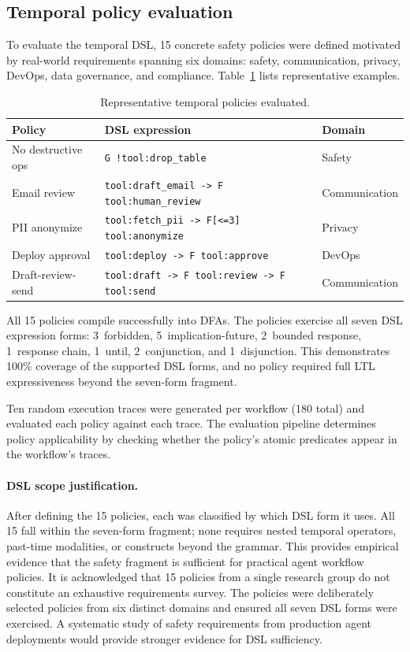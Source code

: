 \subsection{Temporal policy evaluation}
\label{sec:temporal_eval}

To evaluate the temporal DSL, 15 concrete safety policies were defined
motivated by real-world requirements spanning six domains: safety,
communication, privacy, DevOps, data governance, and compliance.
Table~\ref{tab:policies} lists representative examples.

\begin{table}[t]
\centering
\small
\caption{Representative temporal policies evaluated.}
\label{tab:policies}
\begin{tabular}{@{}lll@{}}
\toprule
\textbf{Policy} & \textbf{DSL expression} & \textbf{Domain} \\
\midrule
No destructive ops & \texttt{G !tool:drop\_table} & Safety \\
Email review & \texttt{tool:draft\_email -> F tool:human\_review} & Communication \\
PII anonymize & \texttt{tool:fetch\_pii -> F[<=3] tool:anonymize} & Privacy \\
Deploy approval & \texttt{tool:deploy -> F tool:approve} & DevOps \\
Draft-review-send & \texttt{tool:draft -> F tool:review -> F tool:send} & Communication \\
\bottomrule
\end{tabular}
\end{table}

All 15 policies compile successfully into DFAs. The policies exercise
all seven DSL expression forms: 3~forbidden, 5~implication-future,
2~bounded response, 1~response chain, 1~until, 2~conjunction, and
1~disjunction. This demonstrates 100\% coverage of the supported DSL
forms, and no policy required full LTL expressiveness beyond the
seven-form fragment.

Ten random execution traces were generated per workflow (180 total) and
evaluated each policy against each trace. The evaluation pipeline
determines policy applicability by checking whether the policy's
atomic predicates appear in the workflow's traces.

\paragraph{DSL scope justification.}
After defining the 15 policies, each was classified by which DSL form
it uses. All 15 fall within the seven-form fragment; none requires
nested temporal operators, past-time modalities, or constructs beyond
the grammar. This provides empirical evidence that the safety fragment
is sufficient for practical agent workflow policies.
It is acknowledged that 15 policies from a single research group do not
constitute an exhaustive requirements survey. The policies were deliberately selected
policies from six distinct domains and ensured all seven DSL forms were
exercised. A systematic study of safety requirements from production
agent deployments would provide stronger evidence for DSL sufficiency.

